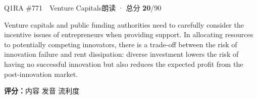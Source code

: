 \begin{qblock}{Q1\quad RA \#771\ \ Venture Capitals}{朗读 · 总分 \textcolor{cAccent}{\bfseries 20}/90}
\begin{promptbox}
Venture capitals and public funding authorities need to carefully consider the incentive issues of entrepreneurs when providing support. In allocating resources to potentially competing innovators, there is a trade-off between the risk of innovation failure and rent dissipation: diverse investment lowers the risk of having no successful innovation but also reduces the expected profit from the post-innovation market.
\end{promptbox}
\asrlegend
\begin{asrbox}
                         \pse {}              \pse {}            \pse {}           
\end{asrbox}
\smallskip
{\small\textbf{评分：}内容  \quad\textperiodcentered\quad 发音  \quad\textperiodcentered\quad 流利度 }
\end{qblock}

